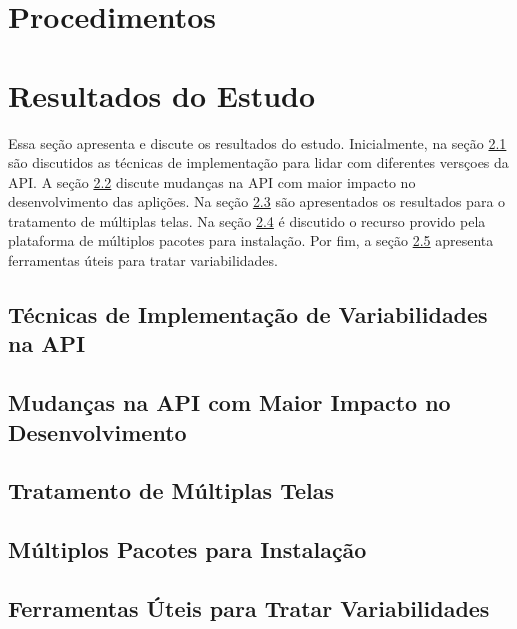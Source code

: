 \section{Procedimentos}
\label{sec:procedimentos}



\section{Resultados do Estudo}
\label{sec:resultados}

Essa seção apresenta e discute os resultados do estudo. Inicialmente, na seção 
\ref{sec:tecnicas} são discutidos as técnicas de implementação para lidar com
diferentes versçoes da API. A seção \ref{sec:mudancas} discute mudanças na API
com maior impacto no desenvolvimento das aplições.
Na seção \ref{sec:multiplas_telas} são apresentados os
resultados para o tratamento de múltiplas telas. Na seção \ref{sec:multiplos_pacotes}
é discutido o recurso provido pela plataforma de múltiplos pacotes para instalação.
Por fim, a seção \ref{sec:ferramentas} apresenta ferramentas úteis para tratar variabilidades. 

\subsection{Técnicas de Implementação de Variabilidades na API}
\label{sec:tecnicas}

\subsection{Mudanças na API com Maior Impacto no Desenvolvimento}
\label{sec:mudancas}

\subsection{Tratamento de  Múltiplas Telas}
\label{sec:multiplas_telas}

\subsection{Múltiplos Pacotes para Instalação}
\label{sec:multiplos_pacotes}

\subsection{Ferramentas Úteis para Tratar Variabilidades}
\label{sec:ferramentas}


